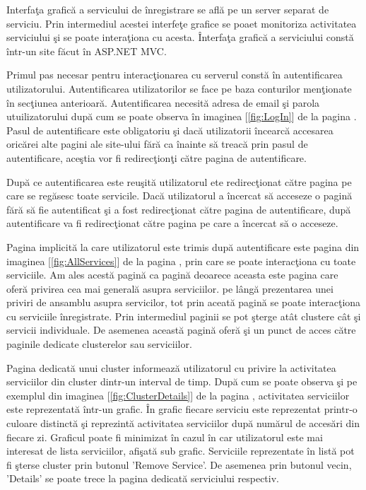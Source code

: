 \documentclass[a4paper,12pt]{report}
\let\oldref\ref
\renewcommand{\ref}[1]{[\oldref{#1}]}
\begin{document}
Interfa\c ta grafic\u a a servicului de \^inregistrare se afl\u a pe un server separat de serviciu.
Prin intermediul acestei interfe\c te grafice se poaet monitoriza activitatea serviciului \c si se poate intera\c tiona 
cu acesta. \^Interfa\c ta grafic\u a a serviciului const\u a \^intr-un site f\u acut \^in ASP.NET MVC. 

Primul pas 
necesar pentru interac\c tionarea cu serverul const\u a \^in autentificarea utilizatorului. Autentificarea utilizatorilor 
se face pe baza conturilor men\c tionate \^in sec\c tiunea anterioar\u a. Autentificarea necesit\u a adresa de email 
\c si parola utuilizatorului dup\u a cum se poate observa \^in imaginea \ref{fig:LogIn} de la pagina \pageref{fig:LogIn}.  
Pasul de autentificare este obligatoriu \c si dac\u a utilizatorii \^incearc\u a accesarea oric\u arei alte pagini ale 
site-ului f\u ar\u a ca \^inainte s\u a treac\u a prin pasul de autentificare, ace\c stia vor fi redirec\c tion\c ti 
c\u atre pagina de autentificare.

Dup\u a ce autentificarea este reu\c sit\u a utilizatorul ete redirec\c tionat c\u atre pagina pe care se reg\u asesc toate 
servicile. Dac\u a utilizatorul a \^incercat s\u a acceseze o pagin\u a f\u ar\u a s\u a fie autentificat \c si a fost redirec\c tionat
c\u atre pagina de autentificare, dup\u a autentificare va fi redirec\c tionat c\u atre pagina pe care a \^incercat s\u a
o acceseze.

Pagina implicit\u a la care utilizatorul este trimis dup\u a autentificare este pagina din imaginea \ref{fig:AllServices} de la 
pagina \pageref{fig:AllServices}, prin care se poate interac\c tiona cu toate serviciile. Am ales acest\u a pagin\u a ca pagin\u a 
deoarece aceasta este pagina care ofer\u a privirea cea mai general\u a asupra serviciilor. pe l\^ang\u a prezentarea unei priviri de ansamblu 
asupra servicilor, tot prin aceat\u a pagin\u a se poate interac\c tiona cu serviciile \^inregistrate. Prin intermediul paginii
se pot \c sterge at\^at clustere c\^at \c si servicii individuale. De asemenea aceast\u a pagin\u a ofer\u a \c si un punct de 
acces c\u atre paginile dedicate clusterelor sau serviciilor.

Pagina dedicat\u a unui cluster informeaz\u a utilizatorul cu privire la activitatea serviciilor din cluster dintr-un interval de timp.
Dup\u a cum se poate observa \c si pe exemplul din imaginea \ref{fig:ClusterDetails} de la pagina \pageref{fig:ClusterDetails},
activitatea serviciilor este reprezentat\u a \^intr-un grafic. \^In grafic fiecare serviciu este reprezentat printr-o
culoare distinct\u a \c si reprezint\u a activitatea serviciilor dup\u a num\u arul de acces\u ari din fiecare zi.
Graficul poate fi minimizat \^in cazul \^in car utilizatorul este mai interesat de lista serviciilor, afi\c sat\u a 
sub grafic. Serviciile reprezentate \^in list\u a pot fi \c sterse cluster prin butonul 'Remove Service'. De asemenea 
prin butonul vecin, 'Details' se poate trece la pagina dedicat\u a serviciului respectiv. 
\end{document}
